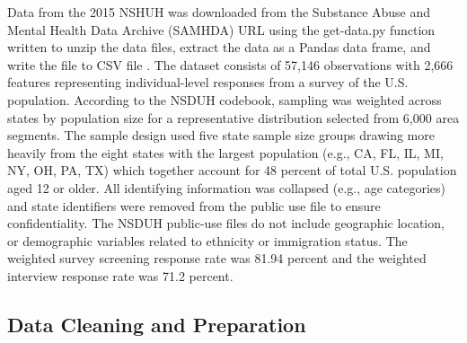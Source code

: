 \documentclass[sigconf]{acmart}
\begin{document}
Data from the 2015 NSHUH was downloaded from the Substance Abuse and Mental 
Health Data Archive (SAMHDA) \cite{samhsa16} URL using the get-data.py 
function written to unzip the data files, extract the data as a Pandas data 
frame, and write the file to CSV file \cite{getdata17}. The dataset consists 
of 57,146 observations with 2,666 features representing individual-level 
responses from a survey of the U.S. population. According to the NSDUH 
codebook, sampling was weighted across states by population size for a 
representative distribution selected from 6,000 area segments. The sample 
design used five state sample size groups drawing more heavily from the eight 
states with the largest population (e.g., CA, FL, IL, MI, NY, OH, PA, TX) which 
together account for 48 percent of total U.S. population aged 12 or older. 
All identifying information was collapsed (e.g., age categories) and state 
identifiers were removed from the public use file to ensure confidentiality. 
The NSDUH public-use files do not include geographic location, or demographic 
variables related to ethnicity or immigration status. The weighted survey 
screening response rate was 81.94 percent and the weighted interview response 
rate was 71.2 percent. 

\subsection{Data Cleaning and Preparation }
\end{document}
